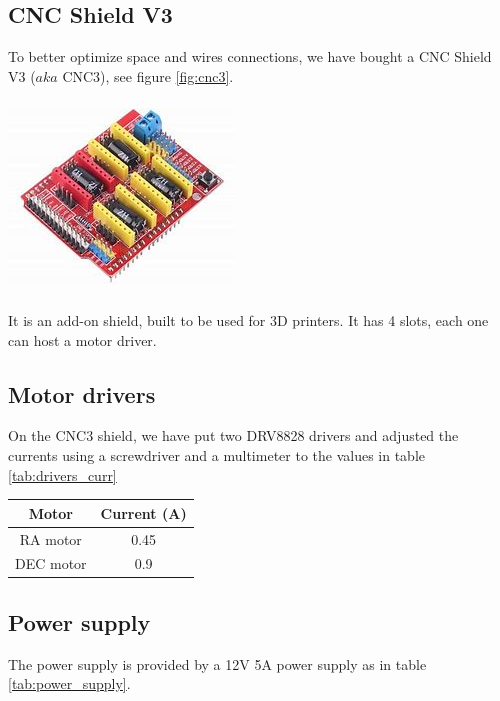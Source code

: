 \documentclass{article}
\begin{document}
\begin{multicols}{2}
        \subsection{CNC Shield V3}
        To better optimize space and wires connections, we have bought a CNC Shield V3 (\(aka\) CNC3), see figure \ref{fig:cnc3}.
        \begin{minipage}
            {0.5\textwidth}
            \centering
            \includegraphics[scale=0.5]{CNC3.jpg}
            \label{fig:cnc3}
        \end{minipage}
        It is an add-on shield, built to be used for 3D printers.
        It has 4 slots, each one can host a motor driver.

        \subsection{Motor drivers}
        On the CNC3 shield, we have put two DRV8828 drivers and adjusted the currents using a screwdriver and a multimeter to the values in table \ref{tab:drivers_curr}

        \begin{minipage}
            {.5\textwidth}
            \centering
            \begin{tabular}{cc}
                Motor & Current (A) \\
                \hline
                RA motor & 0.45 \\
                DEC motor & 0.9 \\                
            \end{tabular}
            \label{tab:drivers_curr}
        \end{minipage}

        \subsection{Power supply}
        The power supply is provided by a 12V 5A power supply as in table \ref{tab:power_supply}.


\end{multicols}
\end{document}
